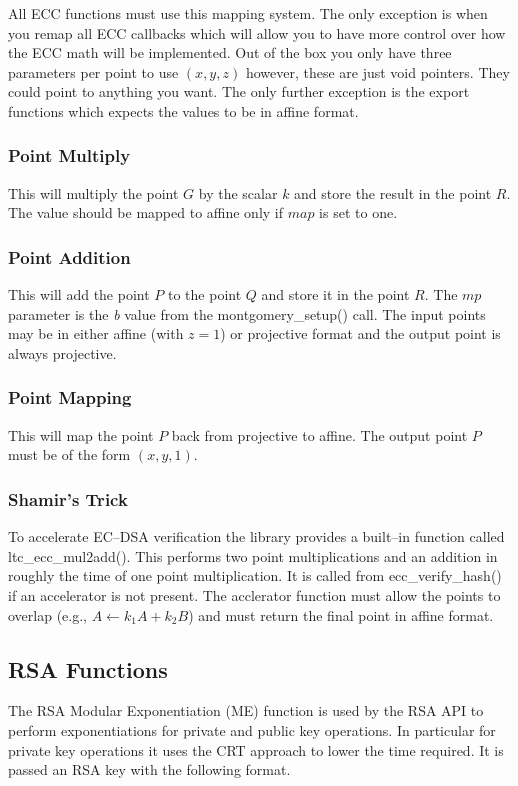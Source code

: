 \documentclass[synpaper]{book}
\begin{document}
All ECC functions must use this mapping system.  The only exception is when you remap all ECC callbacks which will allow you to have more control
over how the ECC math will be implemented.  Out of the box you only have three parameters per point to use $(x, y, z)$ however, these are just void pointers.  They
could point to anything you want.  The only further exception is the export functions which expects the values to be in affine format.

\subsubsection{Point Multiply}
This will multiply the point $G$ by the scalar $k$ and store the result in the point $R$.  The value should be mapped to affine only if $map$ is set to one.

\subsubsection{Point Addition}
This will add the point $P$ to the point $Q$ and store it in the point $R$.  The $mp$ parameter is the \textit{b} value from the montgomery\_setup() call.  The input points
may be in either affine (with $z = 1$) or projective format and the output point is always projective.

\subsubsection{Point Mapping}
This will map the point $P$ back from projective to affine.  The output point $P$ must be of the form $(x, y, 1)$.

\subsubsection{Shamir's Trick}
To accelerate EC--DSA verification the library provides a built--in function called ltc\_ecc\_mul2add().  This performs two point multiplications and an addition in
roughly the time of one point multiplication.  It is called from ecc\_verify\_hash() if an accelerator is not present.  The acclerator function must allow the points to
overlap (e.g., $A \leftarrow k_1A + k_2B$) and must return the final point in affine format.


\subsection{RSA Functions}
The RSA Modular Exponentiation (ME) function is used by the RSA API to perform exponentiations for private and public key operations.  In particular for
private key operations it uses the CRT approach to lower the time required.  It is passed an RSA key with the following format.
\end{document}
